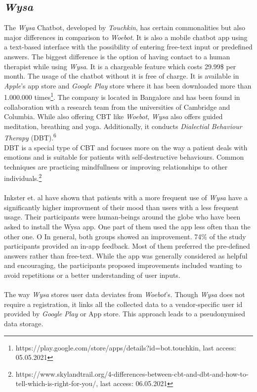 \documentclass[sigconf, nonacm]{acmart}
\begin{document}
\subsection{\emph{Wysa}}
The \emph{Wysa} Chatbot, developed by \emph{Touchkin}, has certain commonalities but also major differences in comparison to \emph{Woebot}. It is also a mobile chatbot app using a text-based interface with the possibility of entering 
free-text input or predefined answers. The biggest difference is the option of having contact to 
a human therapist while using \emph{Wysa}. It is a chargeable feature which costs 29.99\$ per month. The usage of the chatbot without it is free of charge. It is available
in \emph{Apple}'s app store and \emph{Google Play} store where it has been downloaded more than 1.000.000 times\footnote{https://play.google.com/store/apps/details?id=bot.touchkin, last access: 05.05.2021}. 
The company is located in Bangalore and has been found in collaboration with a research team from the universities of Cambridge and Columbia.
While also offering CBT like \emph{Woebot}, \emph{Wysa} also offers guided meditation, breathing and yoga. Additionally, it conducts \emph{Dialectial Behaviour Therapy} (DBT).\textsuperscript{6} 
\\
DBT is a special type of CBT and focuses more on the way a patient deals with emotions and is suitable for patients with self-destructive behaviours. Common techniques are practicing mindfullness or 
improving relationships to other individuals.\footnote{https://www.skylandtrail.org/4-differences-between-cbt-and-dbt-and-how-to-tell-which-is-right-for-you/, last access: 06.05.2021} 
\\\\
Inkster et. al \cite{Inkster} have shown that patients with a more frequent use of \emph{Wysa} have a significantly higher improvment of their mood than users
with a less frequent usage. Their participants were human-beings around the globe who have been asked to install the Wysa app. One part of them used the app less often than the other one. O In general, both groups showed an improvement. 74\% of the study participants provided an in-app feedback. Most of them preferred the pre-defined answers rather than free-text.
While the app was generally considered as helpful and encouraging, the participants proposed improvements included wanting to avoid repetitions or a better understanding of user inputs.
\\\\
The way \emph{Wysa} stores user data deviates from \emph{Woebot}'s. Though \emph{Wysa} does not require a registration, it links all the collected data to a vendor-specific user id provided by \emph{Google Play} or App store. This approach leads to a pseudonymised data storage.
\end{document}
